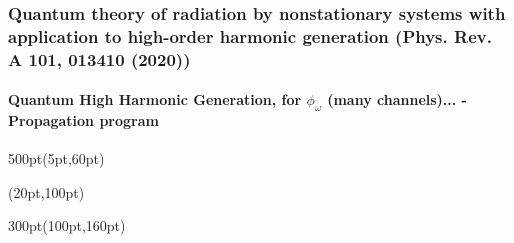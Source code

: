 \begin{frame}
\frametitle{Quantum theory of radiation by nonstationary systems 
        with application to high-order harmonic generation
        (Phys. Rev. A 101, 013410 (2020))}
        \framesubtitle{Quantum High Harmonic Generation, 
        for $\phi_\omega$ (many channels)... - Propagation program}
\small
\begin{textblock*}{500pt}(5pt,60pt)
 \begin{minipage}{0.0\linewidth}
 \begin{figure}[tp]
 \end{figure}

\end{minipage}
\end{textblock*}



\begin{textblock*}{\linewidth}(20pt,100pt)
\end{textblock*}

\begin{textblock*}{300pt}(100pt,160pt)
\end{textblock*}

%
%
%
%

\end{frame}
